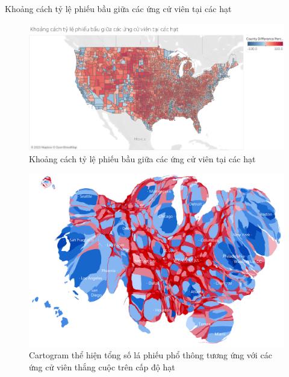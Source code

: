 \documentclass[10pt]{beamer}
\theoremstyle{remark}
\theoremstyle{definition}
\begin{document}
\begin{frame}{Khoảng cách tỷ lệ phiếu bầu giữa các ứng cử viên tại các hạt}
	\begin{figure}[h!]
        \centering
        \includegraphics[width=\textwidth]{figures/County_Difference_Percentage_Total_Vote_Two_Candidate.png}
        \caption{Khoảng cách tỷ lệ phiếu bầu giữa các ứng cử viên tại các hạt}
    \end{figure}
\end{frame}

\begin{frame}
	\begin{figure}[h!]
        \centering
        \includegraphics[width=\textwidth]{figures/County_Total_Vote_Cartogram.png}
        \caption{Cartogram thể hiện tổng số lá phiếu phổ thông tương ứng với các ứng cử viên thắng cuộc trên cấp độ hạt}
    \end{figure}
\end{frame}
\end{document}
